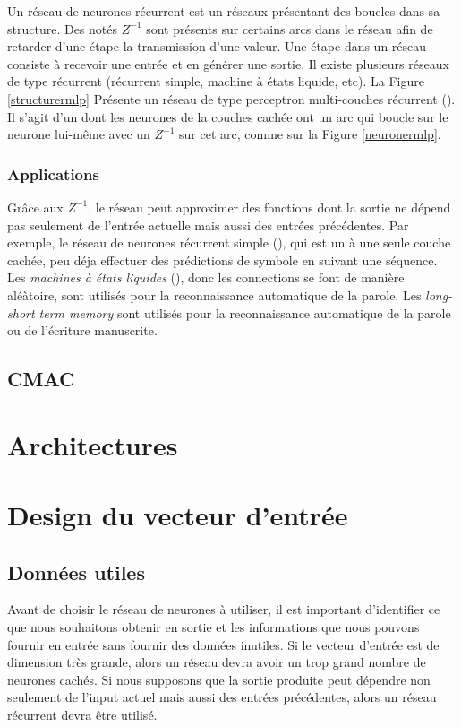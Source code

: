 \documentclass[12pt,a4paper,oneside, titlepage]{article}
\begin{document}
Un réseau de neurones récurrent est un réseaux présentant des boucles dans sa structure.
Des  notés $Z^{-1}$ sont présents sur certains arcs dans le réseau afin de retarder d'une étape la transmission d'une valeur.
Une étape dans un réseau consiste à recevoir une entrée et en générer une sortie.
Il existe plusieurs réseaux de type récurrent (récurrent simple, machine à états liquide, etc).
La Figure \ref{structurermlp} Présente un réseau de type perceptron multi-couches récurrent (\rmlp).
Il s'agit d'un \mlp dont les neurones de la couches cachée ont un arc qui boucle sur le neurone lui-même avec un $Z^{-1}$ sur cet arc, comme sur la Figure \ref{neuronermlp}.
\subsubsection*{Applications}
Grâce aux  $Z^{-1}$, le réseau peut approximer des fonctions dont la sortie ne dépend pas seulement de l'entrée actuelle mais aussi des entrées précédentes.
Par exemple, le réseau de neurones récurrent simple (\srn), qui est un \rmlp à une seule couche cachée, peu déja effectuer des prédictions de symbole en suivant une séquence.
Les \emph{machines à états liquides} (\lsm), donc les connections se font de manière aléàtoire, sont utilisés pour la reconnaissance automatique de la parole. %
Les \emph{long-short term memory} sont utilisés pour la reconnaissance automatique de la parole ou de l'écriture manuscrite. %

\subsection{CMAC}
\section{Architectures}
\section{Design du vecteur d'entrée}
\subsection{Données utiles}
Avant de choisir le réseau de neurones à utiliser, il est important d'identifier ce que nous souhaitons obtenir en sortie et les informations que nous pouvons fournir en entrée sans fournir des données inutiles.
Si le vecteur d'entrée est de dimension très grande, alors un réseau \rbf devra avoir un trop grand nombre de neurones cachés\cite{Gauthier}.
Si nous supposons que la sortie produite peut dépendre non seulement de l'input actuel mais aussi des entrées précédentes, alors un réseau récurrent devra être utilisé.
\end{document}
